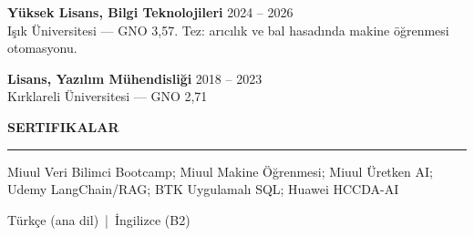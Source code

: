 \documentclass[11pt,a4paper]{article}
\newcommand{\cvsection}[1]{%
  \vspace{1.2em}%
  {\large\textbf{\MakeUppercase{#1}}}\\[0.2em]
  \hrule
  \vspace{0.6em}%
}
\begin{document}
\textbf{Yüksek Lisans, Bilgi Teknolojileri} \hfill 2024 -- 2026\\
Işık Üniversitesi --- GNO 3,57. Tez: arıcılık ve bal hasadında makine öğrenmesi otomasyonu.
\vspace{0.5em}

\textbf{Lisans, Yazılım Mühendisliği} \hfill 2018 -- 2023\\
Kırklareli Üniversitesi --- GNO 2,71

\cvsection{Sertifikalar}

Miuul Veri Bilimci Bootcamp; Miuul Makine Öğrenmesi; Miuul Üretken AI; Udemy LangChain/RAG; BTK Uygulamalı SQL; Huawei HCCDA-AI

\vspace{0.8em}
\begin{center}
  {\small Türkçe (ana dil) \,|\, İngilizce (B2)}
\end{center}
\end{document}
